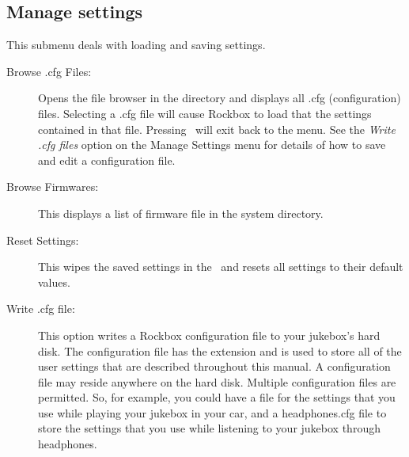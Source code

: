 \subsection{\label{ref:ManageSettings}Manage settings}
This submenu deals with loading and saving settings. 
%
  \begin{description}
    \item [Browse .cfg Files: ]Opens the file browser in the 
     directory and displays all .cfg (configuration) files.
    Selecting a .cfg file will cause Rockbox to load that the settings
    contained in that file. Pressing \ButtonLeft\ will exit back to the menu. 
    See the \emph{Write .cfg files} option on the Manage Settings menu for
    details of how to save and edit a configuration file.
    \item [Browse Firmwares: ]This displays a list of firmware file in
    the  system directory. %
    \item [Reset Settings: ]This wipes the saved settings in the \dap\ and
    resets all settings to their default values. 
    \item [Write .cfg file: ]This option writes a Rockbox configuration file
    to your jukebox's hard disk. The configuration file has the 
    extension and is used to store all of the user settings that are described
    throughout this manual.
    A configuration file may reside anywhere on the hard disk. Multiple
    configuration files are permitted. So, for example, you could have 
    a  file for the settings that you use while playing your
    jukebox in your car, and a headphones.cfg file to store the settings that
    you use while listening to your jukebox through headphones.


\end{description}
